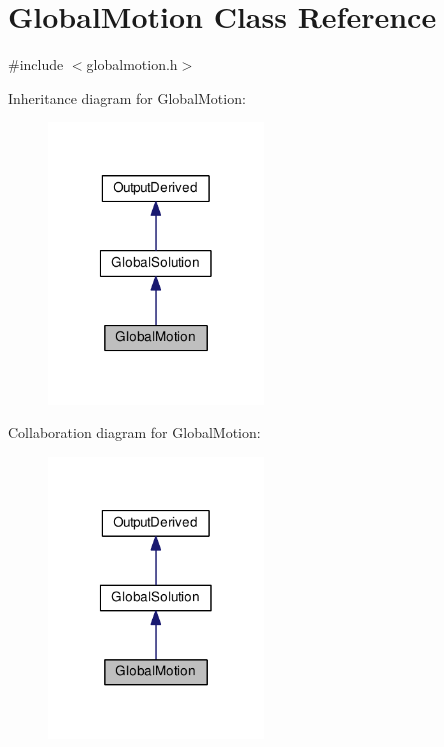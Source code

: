 \hypertarget{class_global_motion}{\section{Global\-Motion Class Reference}
\label{class_global_motion}
}


{\ttfamily \#include $<$globalmotion.\-h$>$}



Inheritance diagram for Global\-Motion\-:\nopagebreak
\begin{figure}[H]
\begin{center}
\leavevmode
\includegraphics[width=162pt]{class_global_motion__inherit__graph}
\end{center}
\end{figure}


Collaboration diagram for Global\-Motion\-:\nopagebreak
\begin{figure}[H]
\begin{center}
\leavevmode
\includegraphics[width=162pt]{class_global_motion__coll__graph}
\end{center}
\end{figure}
